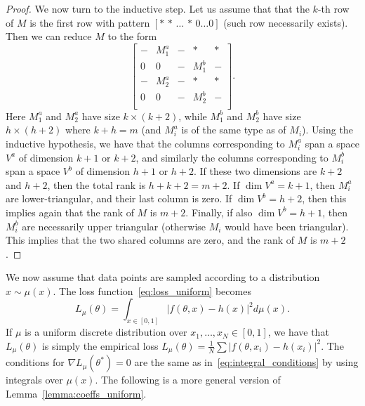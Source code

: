 \documentclass{article}
\begin{document}
\begin{proof}
We now turn to the inductive step. Let us assume that that the $k$-th row of
$M$ is the first row with pattern $[* \, * \, \ldots \, * \, 0 \ldots 0]$
(such row necessarily exists). Then we can reduce $M$ to the form
\begin{equation}
\begin{bmatrix} 
 - & M_1^a & - & * & * \\
0 & 0 & - & M_1^b & - \\
 - & M_2^a & - & * & * \\
0 & 0 & - & M_2^b & - \\
\end{bmatrix}.
\end{equation}
Here $M_1^a$ and $M_2^a$ have size $k \times (k+2)$, while $M_1^b$ and $M_2^b$
have size $h \times (h+2)$ where $k + h = m$ (and $M_i^a$ is of the same type
as of $M_i$). Using the inductive hypothesis, we have that the columns
corresponding to $M_i^a$ span a space $V^a$ of dimension $k+1$ or $k+2$, and
similarly the columns corresponding to $M_i^b$ span a space $V^b$ of dimension
$h+1$ or $h+2$. If these two dimensions are $k+2$ and $h+2$, then the total
rank is $h+k+2 = m+2$. If $\dim V^a = k+1$, then $M_i^a$ are lower-triangular,
and their last column is zero. If $\dim V^b = h+2$, then this implies again
that the rank of $M$ is $m+2$. Finally, if also $\dim V^b = h+1$, then $M_i^b$
are necessarily upper triangular (otherwise $M_i$ would have been triangular).
This implies that the two shared columns are zero, and the rank of $M$ is
$m+2$.
\end{proof}


We now assume that data points are sampled according to a distribution $x \sim
\mu(x)$. The loss function~\eqref{eq:loss_uniform} becomes
\begin{equation}\label{eq:loss_measure}
L_\mu(\theta) = \int_{x \in [0,1]} |f(\theta,x) - h(x)|^2 d\mu(x).
\end{equation}
If $\mu$ is a uniform discrete distribution over $x_1,\ldots,x_N \in [0,1]$,
we have that $L_\mu(\theta)$ is simply the empirical loss $L_\mu(\theta) =
\frac 1 N \sum |f(\theta,x_i) - h(x_i)|^2$. The conditions for $\nabla L_\mu
(\theta^*) = 0$ are the same as in~\eqref{eq:integral_conditions} by using
integrals over $\mu(x)$. The following is a more general version of
Lemma~\ref{lemma:coeffs_uniform}.
\end{document}
